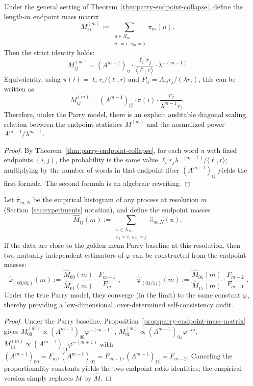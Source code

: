 \begin{proposition}\label{prop:parry-endpoint-mass-matrix}
Under the general setting of Theorem~\ref{thm:parry-endpoint-collapse}, define the length-\(m\) endpoint mass matrix
\[
M^{(m)}_{ij}
:=
\sum_{\substack{u\in X_m\\ u_1=i,\ u_m=j}}\pi_m(u).
\]
Then the strict identity holds:
\[
\boxed{\;
M^{(m)}_{ij}
=
(A^{m-1})_{ij}\cdot \frac{\ell_i r_j}{\langle \ell,r\rangle}\cdot \lambda^{-(m-1)}\;}
\]
Equivalently, using \(\pi(i)=\ell_i r_i/\langle \ell,r\rangle\) and \(P_{ij}=A_{ij}r_j/(\lambda r_i)\), this can be written as
\[
M^{(m)}_{ij}
=(A^{m-1})_{ij}\cdot \pi(i)\cdot \frac{r_j}{\lambda^{m-1}r_i}.
\]
Therefore, under the Parry model, there is an explicit auditable diagonal scaling relation between the endpoint statistics \(M^{(m)}\) and the normalized power \(A^{m-1}/\lambda^{m-1}\).
\end{proposition}
\begin{proof}
By Theorem~\ref{thm:parry-endpoint-collapse}, for each word \(u\) with fixed endpoints \((i,j)\), the probability is the same value
\(\ell_i r_j\lambda^{-(m-1)}/\langle \ell,r\rangle\); multiplying by the number of words in that endpoint fiber \((A^{m-1})_{ij}\) yields the first formula.
The second formula is an algebraic rewriting.
\end{proof}

\begin{corollary}\label{cor:parry-endpoint-phi-estimators}
Let \(\hat\pi_{m,N}\) be the empirical histogram of any process at resolution \(m\) (Section~\ref{sec:experiments} notation), and define the endpoint masses
\[
\widehat M_{ij}(m):=\sum_{\substack{u\in X_m\\ u_1=i,\ u_m=j}}\hat\pi_{m,N}(u).
\]
If the data are close to the golden mean Parry baseline at this resolution, then two mutually independent estimators of \(\varphi\) can be constructed from the endpoint masses:
\[
\boxed{\;
\widehat\varphi_{(00/01)}(m)
:=\frac{\widehat M_{00}(m)}{\widehat M_{01}(m)}\cdot \frac{F_{m-1}}{F_m}\;},
\qquad
\boxed{\;
\widehat\varphi_{(01/11)}(m)
:=\frac{\widehat M_{01}(m)}{\widehat M_{11}(m)}\cdot \frac{F_{m-2}}{F_{m-1}}\;}.
\]
Under the true Parry model, they converge (in the limit) to the same constant \(\varphi\), thereby providing a low-dimensional, over-determined self-consistency audit.
\end{corollary}
\begin{proof}
Under the Parry baseline, Proposition~\ref{prop:parry-endpoint-mass-matrix} gives
\(
M^{(m)}_{00}\propto (A^{m-1})_{00}\varphi^{-(m-1)}\),
\(
M^{(m)}_{01}\propto (A^{m-1})_{01}\varphi^{-m}\),
\(
M^{(m)}_{11}\propto (A^{m-1})_{11}\varphi^{-(m+1)}
\)
with \((A^{m-1})_{00}=F_m,(A^{m-1})_{01}=F_{m-1},(A^{m-1})_{11}=F_{m-2}\).
Canceling the proportionality constants yields the two endpoint ratio identities; the empirical version simply replaces \(M\) by \(\widehat M\).
\end{proof}

